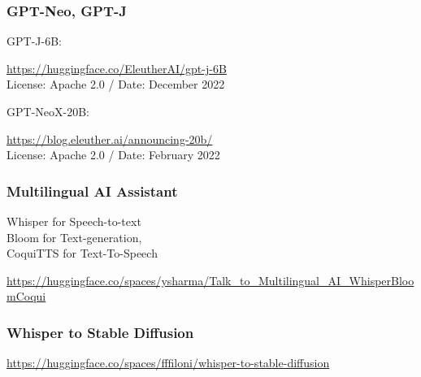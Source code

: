 \documentclass[17pt,aspectratio=169,hyperref={pdfusetitle,colorlinks,allcolors=olive}]{beamer}
\begin{document}
\begin{frame}[fragile]
  \frametitle{GPT-Neo, GPT-J}

  GPT-J-6B:
  \begin{flushright}
    {\small
    \url{https://huggingface.co/EleutherAI/gpt-j-6B}} \\
    License: Apache 2.0 /
    Date: December 2022 \\
  \end{flushright}

  GPT-NeoX-20B:
  \begin{flushright}
    {\small
    \url{https://blog.eleuther.ai/announcing-20b/}} \\
    License: Apache 2.0 /
    Date: February 2022 \\
  \end{flushright}

\end{frame}

\begin{frame}[fragile]
  \frametitle{Multilingual AI Assistant}

   Whisper for Speech-to-text  \\
   Bloom for Text-generation, \\
   CoquiTTS for Text-To-Speech \\
  
  \begin{flushright}
    {\scriptsize
      \url{https://huggingface.co/spaces/ysharma/Talk_to_Multilingual_AI_WhisperBloomCoqui} \\
    }
  \end{flushright}

\end{frame}

\begin{frame}[fragile]
  \frametitle{Whisper to Stable Diffusion}

  
  \begin{flushright}
    {\scriptsize
      \url{https://huggingface.co/spaces/fffiloni/whisper-to-stable-diffusion} \\
    }
  \end{flushright}

\end{frame}
\end{document}
